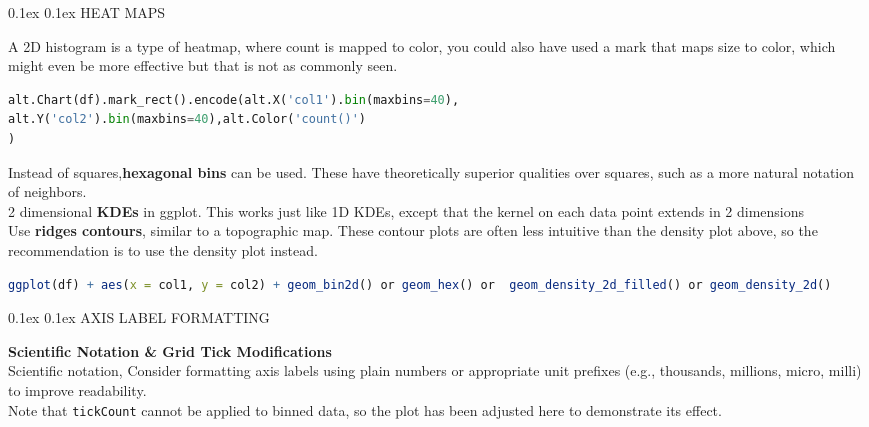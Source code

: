\documentclass[8pt,landscape]{article}
\makeatletter
\renewcommand{\subsection}{\@startsection{subsection}{2}{0pt}%
    {0.1ex}%
    {0.1ex}%
    {\fontsize{8}{9}\bfseries\color{blue}}} %
\newcommand{\smalltext}[1]{%
  {\fontsize{8}{9}\selectfont\sloppy #1\par}%
}
\makeatother
\begin{document}
\begin{multicols}{3}
\subsection{HEAT MAPS}
\smalltext{
A 2D histogram is a type of heatmap, where count is mapped to color, you could also have used a mark that maps size to color, which might even be more effective but that is not as commonly seen.
}
\begin{lstlisting}[language=Python]
alt.Chart(df).mark_rect().encode(alt.X('col1').bin(maxbins=40),
alt.Y('col2').bin(maxbins=40),alt.Color('count()')
)
\end{lstlisting}
\smalltext{
    Instead of squares,\textbf{hexagonal bins} can be used. These have theoretically superior qualities over squares, such as a more natural notation of neighbors. \\
    2 dimensional \textbf{KDEs} in ggplot. This works just like 1D KDEs, except that the kernel on each data point extends in 2 dimensions \\
    Use \textbf{ridges contours}, similar to a topographic map. These contour plots are often less intuitive than the density plot above, so the recommendation is to use the density plot instead.
}
\begin{lstlisting}[language=R]
ggplot(df) + aes(x = col1, y = col2) + geom_bin2d() or geom_hex() or  geom_density_2d_filled() or geom_density_2d()
\end{lstlisting}

\subsection{AXIS LABEL FORMATTING}
\smalltext{
\textbf{Scientific Notation \& Grid Tick Modifications} \\
Scientific notation, Consider formatting axis labels using plain numbers or appropriate unit prefixes (e.g., thousands, millions, micro, milli) to improve readability. \\[6pt]
Note that \texttt{tickCount} cannot be applied to binned data, so the plot has been adjusted here to demonstrate its effect.
}


\end{multicols}
\end{document}
